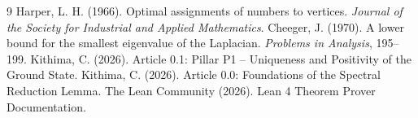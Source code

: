 \documentclass[11pt,a4paper]{article}
\begin{document}

\begin{thebibliography}{9}
  Harper, L. H. (1966). Optimal assignments of numbers to vertices. \emph{Journal of the Society for Industrial and Applied Mathematics}.
  Cheeger, J. (1970). A lower bound for the smallest eigenvalue of the Laplacian. \emph{Problems in Analysis}, 195–199.
  Kithima, C. (2026). Article 0.1: Pillar P1 – Uniqueness and Positivity of the Ground State.
  Kithima, C. (2026). Article 0.0: Foundations of the Spectral Reduction Lemma.
  The Lean Community (2026). Lean 4 Theorem Prover Documentation.
\end{thebibliography}
\end{document}
